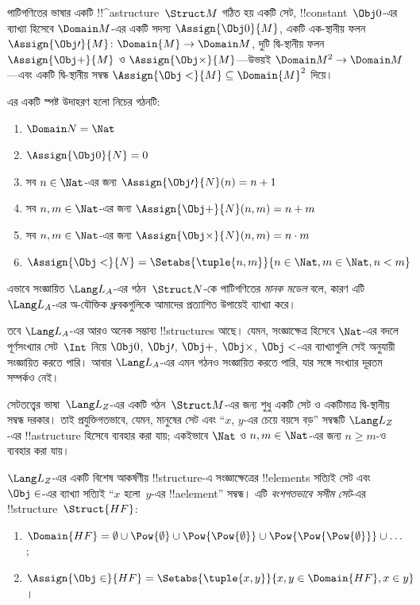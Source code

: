 \documentclass[../../../include/open-logic-section]{subfiles}
\begin{document}
\begin{ex}
পাটিগণিতের ভাষার একটি !!^a{structure}~$\Struct M$ গঠিত হয় একটি সেট,
!!{constant}~$\Obj 0$-এর ব্যাখ্যা হিসেবে $\Domain M$-এর একটি সদস্য
$\Assign{\Obj 0}{M}$, একটি এক-স্থানীয় ফলন
$\Assign{\Obj \prime}{M} \colon \Domain{M} \to \Domain M$, দুটি
দ্বি-স্থানীয় ফলন $\Assign{\Obj +}{M}$ ও $\Assign{\Obj
  \times}{M}$—উভয়ই $\Domain M^2 \to \Domain M$—এবং একটি
দ্বি-স্থানীয় সম্বন্ধ $\Assign{\Obj <}{M} \subseteq \Domain{M}^2$
দিয়ে।

এর একটি স্পষ্ট উদাহরণ হলো নিচের গঠনটি:
\begin{enumerate}
\item $\Domain N = \Nat$
\item $\Assign{\Obj 0}{N} = 0$
\item সব $n \in \Nat$-এর জন্য $\Assign{\Obj \prime}{N}(n) = n + 1$
\item সব $n, m \in \Nat$-এর জন্য $\Assign{\Obj +}{N}(n, m) = n + m$
\item সব $n, m \in \Nat$-এর জন্য $\Assign{\Obj \times}{N}(n, m) = n\cdot m$
\item $\Assign{\Obj <}{N} = \Setabs{\tuple{n, m}}{n \in \Nat, m \in
  \Nat, n < m}$
\end{enumerate}
এভাবে সংজ্ঞায়িত $\Lang L_A$-এর গঠন~$\Struct N$-কে পাটিগণিতের
\emph{মানক মডেল} বলে, কারণ এটি $\Lang L_A$-এর অ-যৌক্তিক ধ্রুবকগুলিকে
আমাদের প্রত্যাশিত উপায়েই ব্যাখ্যা করে।

তবে $\Lang L_A$-এর আরও অনেক সম্ভাব্য !!{structure}s আছে। যেমন,
সংজ্ঞাক্ষেত্র হিসেবে $\Nat$-এর বদলে পূর্ণসংখ্যার সেট~$\Int$ নিয়ে
$\Obj 0$, $\Obj \prime$, $\Obj +$, $\Obj \times$, $\Obj <$-এর
ব্যাখ্যাগুলি সেই অনুযায়ী সংজ্ঞায়িত করতে পারি। আবার $\Lang L_A$-এর
এমন গঠনও সংজ্ঞায়িত করতে পারি, যার সঙ্গে সংখ্যার দূরতম সম্পর্কও নেই।
\end{ex}

\begin{ex}
সেটতত্ত্বের ভাষা~$\Lang L_Z$-এর একটি গঠন~$\Struct M$-এর জন্য শুধু
একটি সেট ও একটিমাত্র দ্বি-স্থানীয় সম্বন্ধ দরকার। তাই প্রযুক্তিগতভাবে,
যেমন, মানুষের সেট এবং “$x$, $y$-এর চেয়ে বয়সে বড়” সম্বন্ধটি
$\Lang L_Z$-এর !!a{structure} হিসেবে ব্যবহার করা যায়; একইভাবে $\Nat$
ও $n, m \in \Nat$-এর জন্য $n \ge m$-ও ব্যবহার করা যায়।

$\Lang L_Z$-এর একটি বিশেষ আকর্ষণীয় !!{structure}-এ সংজ্ঞাক্ষেত্রের
!!{element}s সত্যিই সেট এবং $\Obj \in$-এর ব্যাখ্যা সত্যিই “$x$
হলো~$y$-এর !!a{element}” সম্বন্ধ। এটি \emph{বংশগতভাবে সসীম সেট}-এর
!!{structure}~$\Struct{{HF}}$:
\begin{enumerate}
\item $\Domain{{{HF}}} = \emptyset \cup \Pow{\emptyset} \cup
  \Pow{\Pow{\emptyset}} \cup \Pow{\Pow{\Pow{\emptyset}}} \cup \dots$;
\item $\Assign{\Obj \in}{{{HF}}} = \Setabs{\tuple{x, y}}{x, y \in
  \Domain{{{HF}}}, x \in y}$।
\end{enumerate}
\end{ex}
\end{document}
